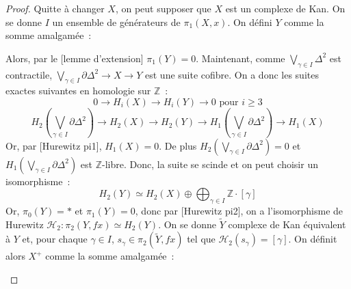 \documentclass{amsart}
\theoremstyle{plain}
\theoremstyle{definition}
\theoremstyle{remark}
\newcommand{\ensemblenombre }[1]{\mathbb{#1}}
\newcommand{\Z}{\ensemblenombre{Z}}
\newcommand{\ra}{\rightarrow}
\begin{document}
\begin{proof}
  Quitte à changer $X$, on peut supposer que $X$ est un complexe de Kan.
  On se donne $I$ un ensemble de générateurs de $\pi_1(X,x)$. On défini $Y$ comme la somme amalgamée~:
  \begin{center}
  \end{center}
  Alors, par le [lemme d'extension] $\pi_1(Y)=0$.
  Maintenant, comme $\bigvee_{\gamma\in I}\Delta^2$ est contractile,
  ${\bigvee_{\gamma\in I}\partial\Delta^2}\ra X\ra Y$ est une suite cofibre. On a donc les suites exactes suivantes en homologie sur $\Z$~:
  $$0\ra H_i(X)\ra H_i(Y)\ra 0\text{ pour }i\geq 3$$
  $$H_2({\bigvee_{\gamma\in I}\partial\Delta^2})\ra H_2(X)\ra H_2(Y)\ra H_1({\bigvee_{\gamma\in I}\partial\Delta^2})\ra H_1(X)$$
  Or, par [Hurewitz pi1], $H_1(X)=0$. De plus $H_2({\bigvee_{\gamma\in I}\partial\Delta^2})=0$
  et $H_1({\bigvee_{\gamma\in I}\partial\Delta^2})$ est $\Z$-libre.
  Donc, la suite se scinde et on peut choisir un isomorphisme~:
  $$H_2(Y)\simeq H_2(X)\oplus \bigoplus_{\gamma\in I}\Z\cdot [\gamma]$$
  Or, $\pi_0(Y)=*$ et $\pi_1(Y)=0$, donc par [Hurewitz pi2], on a l'isomorphisme de Hurewitz $\mathcal{H}_2:\pi_2(Y,fx)\simeq H_2(Y)$.
  On se donne $\tilde{Y}$ complexe de Kan équivalent à $Y$
  et, pour chaque $\gamma\in I$, $s_\gamma\in \pi_2(\tilde{Y},fx)$ tel que $\mathcal{H}_2(s_\gamma)=[\gamma]$.
  On définit alors $X^+$ comme la somme amalgamée~:
  \begin{center}
\end{center}
\end{proof}
\end{document}
